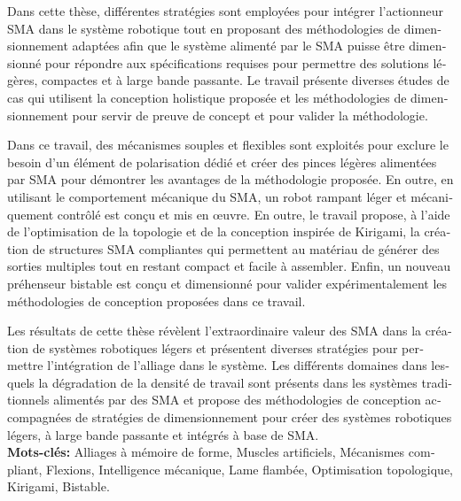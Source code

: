 \begin{otherlanguage}{french}
Dans cette thèse, différentes stratégies sont employées pour intégrer l'actionneur SMA dans le système robotique tout en proposant des méthodologies de dimensionnement adaptées afin que le système alimenté par le SMA puisse être dimensionné pour répondre aux spécifications requises pour permettre des solutions légères, compactes et à large bande passante. Le travail présente diverses études de cas qui utilisent la conception holistique proposée et les méthodologies de dimensionnement pour servir de preuve de concept et pour valider la méthodologie.

Dans ce travail, des mécanismes souples et flexibles sont exploités pour exclure le besoin d'un élément de polarisation dédié et créer des pinces légères alimentées par SMA pour démontrer les avantages de la méthodologie proposée. En outre, en utilisant le comportement mécanique du SMA, un robot rampant léger et mécaniquement contrôlé est conçu et mis en œuvre. En outre, le travail propose, à l'aide de l'optimisation de la topologie et de la conception inspirée de Kirigami, la création de structures SMA compliantes qui permettent au matériau de générer des sorties multiples tout en restant compact et facile à assembler. Enfin, un nouveau préhenseur bistable est conçu et dimensionné pour valider expérimentalement les méthodologies de conception proposées dans ce travail.

Les résultats de cette thèse révèlent l'extraordinaire valeur des SMA dans la création de systèmes robotiques légers et présentent diverses stratégies pour permettre l'intégration de l'alliage dans le système. Les différents domaines dans lesquels la dégradation de la densité de travail sont présents dans les systèmes traditionnels alimentés par des SMA et propose des méthodologies de conception accompagnées de stratégies de dimensionnement pour créer des systèmes robotiques légers, à large bande passante et intégrés à base de SMA.\\

\textbf{Mots-clés:} Alliages à mémoire de forme, Muscles artificiels, Mécanismes compliant, Flexions, Intelligence mécanique, Lame flambée, Optimisation topologique, Kirigami, Bistable.
\end{otherlanguage}



